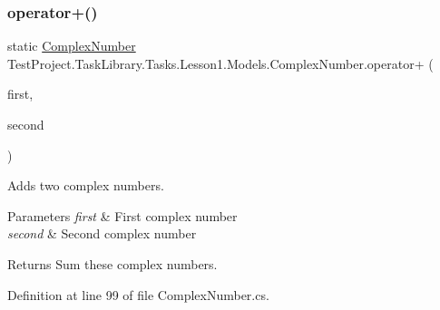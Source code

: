 \subsubsection{\texorpdfstring{operator+()}{operator+()}}
{\footnotesize\ttfamily static \mbox{\hyperlink{class_test_project_1_1_task_library_1_1_tasks_1_1_lesson1_1_1_models_1_1_complex_number}{Complex\+Number}} Test\+Project.\+Task\+Library.\+Tasks.\+Lesson1.\+Models.\+Complex\+Number.\+operator+ (\begin{DoxyParamCaption}\item[{\mbox{\hyperlink{class_test_project_1_1_task_library_1_1_tasks_1_1_lesson1_1_1_models_1_1_complex_number}{Complex\+Number}}}]{first,  }\item[{\mbox{\hyperlink{class_test_project_1_1_task_library_1_1_tasks_1_1_lesson1_1_1_models_1_1_complex_number}{Complex\+Number}}}]{second }\end{DoxyParamCaption})\hspace{0.3cm}{\ttfamily [static]}}



Adds two complex numbers. 


\begin{DoxyParams}{Parameters}
{\em first} & First complex number\\
\hline
{\em second} & Second complex number\\
\hline
\end{DoxyParams}
\begin{DoxyReturn}{Returns}
Sum these complex numbers.
\end{DoxyReturn}


Definition at line 99 of file Complex\+Number.\+cs.

\mbox{\label{class_test_project_1_1_task_library_1_1_tasks_1_1_lesson1_1_1_models_1_1_complex_number_adb1b3fae446217b2cb750ac97f8bbe90}} 
